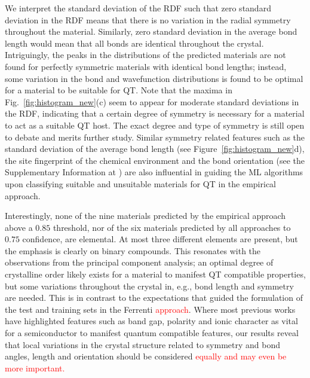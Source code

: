 \documentclass[superscriptaddress,unsortedaddress,
 amsmath,amssymb,
 aps,
]{revtex4-2}
\newcommand{\mrk}[1]{\textcolor{red}{#1}}
\begin{document}
We interpret the standard deviation  of the RDF such that zero standard deviation in the RDF means that there is no variation in the radial symmetry throughout the material. Similarly, zero standard deviation in the average bond length would mean that all bonds are identical throughout the crystal. Intriguingly, the peaks in the distributions of the predicted materials are not found for perfectly symmetric materials with identical bond lengths; instead, some variation in the bond and wavefunction distributions is found to be optimal for a material to be suitable for QT.  
Note that the maxima in  Fig.~\ref{fig:histogram_new}(c) seem to appear for moderate standard deviations in the RDF, indicating that a certain degree of symmetry is necessary for a material to act as a suitable QT host. The exact degree and type of symmetry is still open to debate and merits further study. 
Similar symmetry related features such as the standard deviation of the average bond length (see Figure~\ref{fig:histogram_new}d), the site fingerprint of the chemical environment and the bond orientation (see the Supplementary Information at \cite{supplementary}) are also influential in guiding the ML algorithms upon classifying suitable and unsuitable materials for QT in the empirical approach. 


Interestingly, none of the nine materials predicted by the empirical approach above a $0.85$ threshold, nor of the six materials predicted by all approaches to $0.75$ confidence, are elemental. At most three different elements are present, but the emphasis is clearly on binary compounds. This resonates with the observations from the principal component analysis; an optimal degree of crystalline order likely exists for a material to manifest QT compatible properties, but some variations throughout the crystal in, e.g., bond length and symmetry are needed. This is in contrast to the expectations that guided the formulation of the test and training sets in the Ferrenti \mrk{approach}. Where most previous works have highlighted features such as band gap, polarity and ionic character as vital for a semiconductor to manifest quantum compatible features, our results reveal that local variations in the crystal structure related to symmetry and bond angles, length and orientation should be considered \mrk{equally and may even be more important.} 
\end{document}
